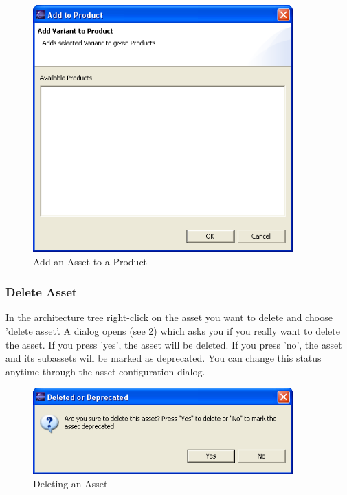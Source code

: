\begin{figure}[h!]
\begin{center}
\includegraphics[width=10cm]{addtoproduct.png}
   \caption{Add an Asset to a Product}
\label{addproduct}
\end{center}
\end{figure}\par


\subsubsection{Delete Asset}
In the architecture tree right-click on the asset you want to delete and choose
'delete asset'. A dialog opens (see \ref{delete}) which asks you if you really want to delete the asset.
If you press 'yes', the asset will be deleted. If you press 'no', the asset and its
subassets will
be marked as deprecated. You can change this status anytime through the asset 
configuration dialog. 


\begin{figure}[h!]
\begin{center}
\includegraphics[width=10cm]{deleteasset.png}
   \caption{Deleting an Asset}
\label{delete}
\end{center}
\end{figure}\par




